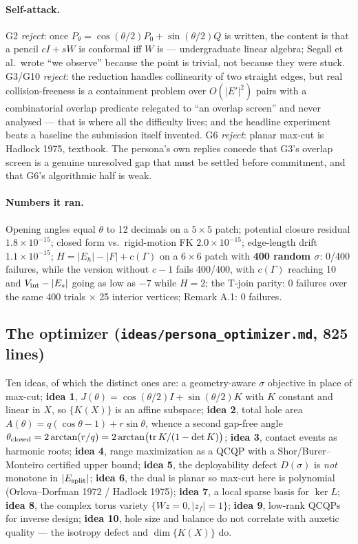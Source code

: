 \documentclass[10pt,a4paper]{article}
\begin{document}
\paragraph{Self-attack.} G2 \emph{reject}: once $P_\theta = \cos(\theta/2)P_0+\sin(\theta/2)Q$
is written, the content is that a pencil $cI+sW$ is conformal iff $W$ is --- undergraduate
linear algebra; Segall et al.\ wrote ``we observe'' because the point is trivial, not because
they were stuck. G3/G10 \emph{reject}: the reduction handles collinearity of two straight edges,
but real collision-freeness is a containment problem over $O(|E'|^2)$ pairs with a
combinatorial overlap predicate relegated to ``an overlap screen'' and never analysed --- that
is where all the difficulty lives; and the headline experiment beats a baseline the submission
itself invented. G6 \emph{reject}: planar max-cut is Hadlock 1975, textbook.
The persona's own replies concede that G3's overlap screen is a genuine unresolved gap that
must be settled before commitment, and that G6's algorithmic half is weak.

\paragraph{Numbers it ran.} Opening angles equal $\theta$ to 12 decimals on a $5\times5$ patch;
potential closure residual $1.8\times10^{-15}$; closed form vs.\ rigid-motion FK
$2.0\times10^{-15}$; edge-length drift $1.1\times10^{-15}$;
$H = |E_h|-|F|+c(\Gamma)$ on a $6\times6$ patch with \textbf{400 random $\sigma$}: 0/400
failures, while the version without $c-1$ fails 400/400, with $c(\Gamma)$ reaching 10 and
$V_{\rm int}-|E_s|$ going as low as $-7$ while $H = 2$; the T-join parity: 0 failures over the
same 400 trials $\times$ 25 interior vertices; Remark A.1: 0 failures.

\subsection{The optimizer (\texttt{ideas/persona\_optimizer.md}, 825 lines)}

Ten ideas, of which the distinct ones are: a geometry-aware $\sigma$ objective in place of
max-cut; \textbf{idea 1}, $J(\theta) = \cos(\theta/2)I+\sin(\theta/2)K$ with $K$ constant and
linear in $X$, so $\{K(X)\}$ is an affine subspace; \textbf{idea 2}, total hole area
$A(\theta) = q(\cos\theta - 1) + r\sin\theta$, whence a second gap-free angle
$\theta_{\rm closed} = 2\arctan(r/q) = 2\arctan\!\big(\mathrm{tr}\,K/(1-\det K)\big)$;
\textbf{idea 3}, contact events as harmonic roots; \textbf{idea 4}, range maximization as a QCQP
with a Shor/Burer--Monteiro certified upper bound; \textbf{idea 5}, the deployability defect
$D(\sigma)$ is \emph{not} monotone in $|E_{\rm split}|$; \textbf{idea 6}, the dual is planar so
max-cut here is polynomial (Orlova--Dorfman 1972 / Hadlock 1975); \textbf{idea 7}, a local
sparse basis for $\ker L$; \textbf{idea 8}, the complex torus variety
$\{Wz = 0, |z_f| = 1\}$; \textbf{idea 9}, low-rank QCQPs for inverse design; \textbf{idea 10},
hole size and balance do not correlate with auxetic quality --- the isotropy defect and
$\dim\{K(X)\}$ do.
\end{document}
